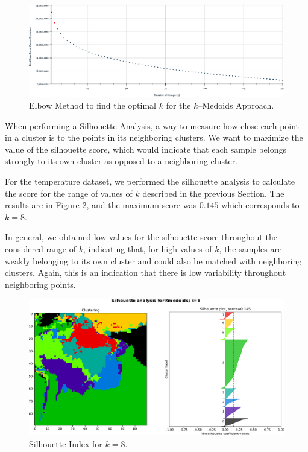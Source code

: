 \begin{figure}[h]
	\centering
	\includegraphics[scale=0.5]{../Figures/Elbow-Kmedoids}
	\caption{Elbow Method to find the optimal $k$ for the $k$--Medoids Approach.}
	\label{Fig:SSE-kMedoids}
\end{figure}

When performing a Silhouette Analysis, a way to measure how close each point in a cluster is to the points in its neighboring clusters. We want to maximize the value of the silhouette score, which would indicate that each sample belongs strongly to its own cluster as opposed to a neighboring cluster.

For the temperature dataset, we performed the silhouette analysis to calculate the score for the range of values of $k$ described in the previous Section. The results are in Figure \ref{Fig:Silhouette-kMedoids}, and the maximum score was $0.145$ which corresponds to $k = 8$. 

In general, we obtained low values for the silhouette score throughout the considered range of $k$, indicating that, for high values of $k$, the samples are weakly belonging to its own cluster and could also be matched with neighboring clusters. Again, this is an indication that there is low variability throughout neighboring points.

\begin{figure}[h]
	\centering
	\includegraphics[scale=0.50]{../Figures/silhouette-kmedoids_k8_seed0_lite}
	\caption{Silhouette Index for $k=8$.}
	\label{Fig:Silhouette-kMedoids}
\end{figure}

